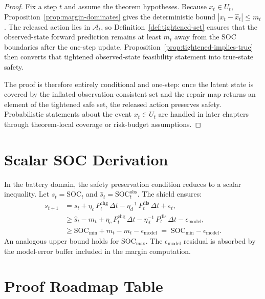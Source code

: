 \begin{proof}
Fix a step $t$ and assume the theorem hypotheses.  Because $x_t \in U_t$,
Proposition~\ref{prop:margin-dominates} gives the deterministic bound
$|x_t-\hat{x}_t| \le m_t$.  The released action lies in $\mathcal{A}_t$, so
Definition~\ref{def:tightened-set} ensures that the observed-state forward
prediction remains at least $m_t$ away from the SOC boundaries after the
one-step update.  Proposition~\ref{prop:tightened-implies-true} then converts
that tightened observed-state feasibility statement into true-state safety.

The proof is therefore entirely conditional and one-step: once the latent
state is covered by the inflated observation-consistent set and the repair map
returns an element of the tightened safe set, the released action preserves
safety.  Probabilistic statements about the event $x_t \in U_t$ are handled in
later chapters through theorem-local coverage or risk-budget assumptions.
\end{proof}

\section{Scalar SOC Derivation}

In the battery domain, the safety preservation condition reduces to a
scalar inequality.  Let $s_t = \text{SOC}_t$ and
$\hat{s}_t = \text{SOC}_t^{\text{obs}}$.  The shield ensures:
\begin{align}
  s_{t+1} &= s_t + \eta_c\,P_t^{\text{chg}}\,\Delta t
    - \eta_d^{-1}\,P_t^{\text{dis}}\,\Delta t + \epsilon_t, \nonumber \\
  &\ge \hat{s}_t - m_t + \eta_c\,P_t^{\text{chg}}\,\Delta t
    - \eta_d^{-1}\,P_t^{\text{dis}}\,\Delta t - \epsilon_{\text{model}},
    \nonumber \\
  &\ge \text{SOC}_{\min} + m_t - m_t - \epsilon_{\text{model}}
    \;=\; \text{SOC}_{\min} - \epsilon_{\text{model}}.
    \label{eq:soc-lower}
\end{align}
An analogous upper bound holds for $\text{SOC}_{\max}$.  The
$\epsilon_{\text{model}}$ residual is absorbed by the model-error buffer
included in the margin computation.

\section{Proof Roadmap Table}

